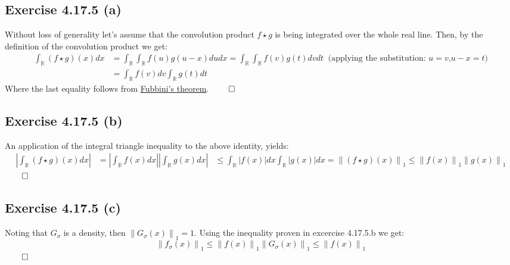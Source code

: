 \documentclass{exam}
\renewenvironment{proof}{{\noindent\itshape\ignorespaces}}{{\hfill$\qed$\\}}
\begin{document}
\subsection*{Exercise 4.17.5 (a)}
\begin{proof}
    Without loss of generality let's assume that the convolution product $f \star g$ is being integrated over the whole real line. Then, by the definition of the 
    convolution product we get:\\
    \begin{equation*}
        \begin{aligned}
            \int_{\mathbb{R}} (f \star g) (x) d x  &= \displaystyle \int_{\mathbb{R}} \int_{\mathbb{R}} f(u) g(u-x) du dx = \displaystyle \int_{\mathbb{R}} \int_{\mathbb{R}} f(v) g(t) dv dt   \ \text{ (applying the substitution: } u = v \text{,}  u- x = t \text{)}\\
            &= \int_{\mathbb{R}} f(v) d v \displaystyle \int_{\mathbb{R}} g(t) dt
        \end{aligned}    
    \end{equation*}
\noindent Where the last equality follows from \href{https://en.wikipedia.org/wiki/Fubini%27s_theorem}{Fubbini's theorem}.
\end{proof}

\subsection*{Exercise 4.17.5 (b)}
\begin{proof}
    An application of the integral triangle inequality to the above identity, yields:
    \begin{equation*}
        \begin{aligned}
        \left| \int_{\mathbb{R}} (f \star g) (x) d x  \right| &= \left| \int_{\mathbb{R}} f (x) d x  \right| \left| \int_{\mathbb{R}} g (x) d x  \right|
        &\leq \int_{\mathbb{R}} \left|  f (x) \right| d x  \int_{\mathbb{R}} \left|  g (x) \right| d x = {\lVert (f\star g )(x) \lVert}_{1} \leq {\lVert f(x) \lVert}_{1}{\lVert g(x) \lVert}_{1}
        \end{aligned}    
    \end{equation*} 
\end{proof}
\subsection*{Exercise 4.17.5 (c)}
\begin{proof}
    \noindent Noting that $G_{\sigma}$ is a density, then ${\lVert G_{\sigma}(x) \lVert}_{1} = 1$. Using the inequality proven in excercise 4.17.5.b we get:\\
    \begin{equation*}
        {\lVert f_{\sigma}(x) \lVert}_{1} \leq {\lVert f(x) \lVert}_{1}{\lVert G_{\sigma}(x) \lVert}_{1} \leq {\lVert f(x) \lVert}_{1} 
    \end{equation*}
\end{proof}    
\end{document}
